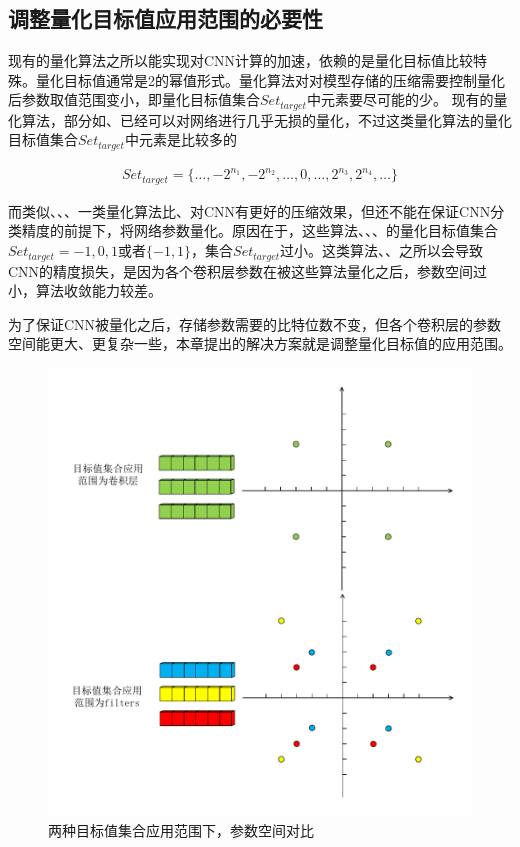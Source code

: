 \documentclass[ pdftex, oneside, master]{NJUthesis}
\begin{document}
\subsection{调整量化目标值应用范围的必要性}

现有的量化算法之所以能实现对CNN计算的加速，依赖的是量化目标值比较特殊。量化目标值通常是2的幂值形式。量化算法对对模型存储的压缩需要控制量化后参数取值范围变小，即量化目标值集合$Set_ {target}$中元素要尽可能的少。
现有的量化算法，部分如\cite{incremental}、\cite{extremely}已经可以对网络进行几乎无损的量化，不过这类量化算法的量化目标值集合$Set_ {target}$中元素是比较多的

\begin{eqnarray}
Set_ {target}=\{\dots, -2^{n_1}, -2^{n_2}, \dots, 0, \dots, 2^{n_3}, 2^{n_4}, \dots\}
\end{eqnarray}

\noindent 而类似\cite{binary}、\cite{binary1}、\cite{ternary}、\cite{xnornet}一类量化算法比\cite{incremental}、\cite{extremely}对CNN有更好的压缩效果，但还不能在保证CNN分类精度的前提下，将网络参数量化。原因在于，这些算法\cite{binary}、\cite{binary1}、\cite{ternary}、\cite{xnornet}的量化目标值集合$Set_ {target}={-1,0,1}$或者$\{-1, 1\}$，集合$Set_ {target}$过小。这类算法\cite{binary}、\cite{ternary}、\cite{xnornet}之所以会导致CNN的精度损失，是因为各个卷积层参数在被这些算法量化之后，参数空间过小，算法收敛能力较差。

为了保证CNN被量化之后，存储参数需要的比特位数不变，但各个卷积层的参数空间能更大、更复杂一些，本章提出的解决方案就是调整量化目标值的应用范围。



\begin{figure}
\centering
\includegraphics[scale=0.7]{param_range.pdf}
\caption{两种目标值集合应用范围下，参数空间对比}
\label{param_range}
\end{figure}
\end{document}

